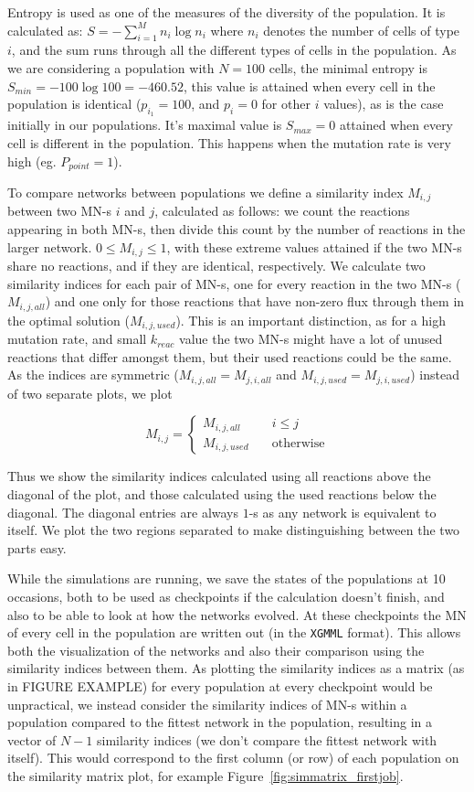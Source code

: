 \documentclass[a4paper,12pt]{article}
\begin{document}
Entropy is used as one of the measures of the diversity of the population. It is calculated as: $S=- \sum^{M}_{i=1} n_i \log n_i $ where $n_i$ denotes the number of cells of type $i$, and the sum runs through all the different types of cells in the population.  As we are considering a population with $N=100$ cells, the minimal entropy is $S_{min}=-100\log100=-460.52$, this value is attained when every cell in the population is identical ($p_{i_1}=100$, and $p_i=0$ for other $i$ values), as is the case initially in our populations. It's maximal value is $S_{max}=0$ attained when every cell is different in the population. This happens when the mutation rate is very high (eg. $P_{point}=1$). 


To compare networks between populations we define a similarity index $M_{i,j}$ between two MN-s $i$ and $j$, calculated as follows: we count the reactions appearing in both MN-s, then divide this count by the number of reactions in the larger network. $0\leq M_{i,j} \leq 1$, with these extreme values attained if the two MN-s share no reactions, and if they are identical, respectively. We calculate two similarity indices for each pair of MN-s, one for every reaction in the two MN-s ($M_{i,j,all}$) and one only for those reactions that have non-zero flux through them in the optimal solution ($M_{i,j,used}$). This is an important distinction, as for a high mutation rate, and small $k_{reac}$ value the two MN-s might have a lot of unused reactions that differ amongst them, but their used reactions could be the same.  As the indices are symmetric ($M_{i,j,all}=M_{j,i,all}$ and  $M_{i,j,used}=M_{j,i,used}$) instead of two separate plots, we plot 

$$
M_{i,j}= \left\{
	\begin{array}{ll}
		M_{i,j,all} & \quad i \leq j \\
		M_{i,j,used} & \quad \text{otherwise}
	\end{array}
\right.
$$

Thus we show the similarity indices calculated using all reactions above the diagonal of the plot, and those calculated using the used reactions below the diagonal. The diagonal entries are always $1$-s as any network is equivalent to itself. We plot the two regions separated to make distinguishing between the two parts easy.

While the simulations are running, we save the states of the populations at 10 occasions, both to be used as checkpoints if the calculation doesn't finish, and also to be able to look at how the networks evolved. At these checkpoints the MN of every cell in the population are written out (in the \texttt{XGMML} format). This allows both the visualization of the networks and also their comparison using the similarity indices between them. As plotting the similarity indices as a matrix (as in FIGURE EXAMPLE) for every population at every checkpoint would be unpractical, we instead consider the similarity indices of MN-s within a population compared to the fittest network in the population, resulting in a vector of $N-1$ similarity indices (we don't compare the fittest network with itself). This would correspond to the first column (or row) of each population on the similarity matrix plot, for example Figure~\ref{fig:simmatrix_firstjob}.
\end{document}
